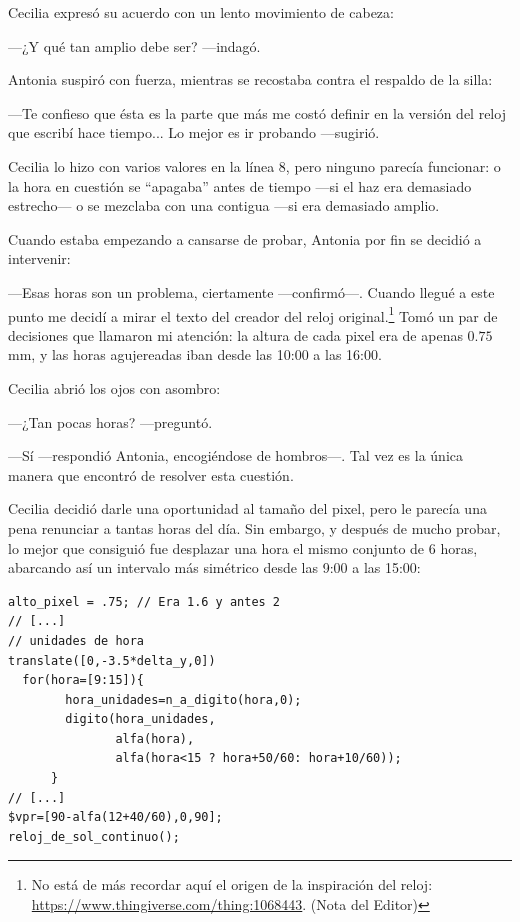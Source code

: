 Cecilia expresó su acuerdo con un lento movimiento de cabeza:

---¿Y qué tan amplio debe ser? ---indagó.

Antonia suspiró con fuerza, mientras se recostaba contra el respaldo
de la silla:

---Te confieso que ésta es la parte que más me costó definir en la
versión del reloj que escribí hace tiempo... Lo mejor es ir probando
---sugirió.

Cecilia lo hizo con varios valores en la línea 8, pero ninguno parecía
funcionar: o la hora en cuestión se ``apagaba'' antes de tiempo ---si
el haz era demasiado estrecho--- o se mezclaba con una contigua ---si
era demasiado amplio.

Cuando estaba empezando a cansarse de probar, Antonia por fin se
decidió a intervenir:

---Esas horas son un problema, ciertamente ---con\-fir\-\mbox{mó---.} Cuando
llegué a este punto me decidí a mirar el texto del creador del reloj
original.\footnote{No está de más recordar aquí el origen de la
  inspiración del reloj:
  \url{https://www.thingiverse.com/thing:1068443}. (Nota del Editor)}
Tomó un par de decisiones que llamaron mi atención: la altura de cada
pixel era de apenas $0.75$ mm, y las horas agujereadas iban desde las
10:00 a las 16:00.

Cecilia abrió los ojos con asombro:

---¿Tan pocas horas?  ---preguntó.

---Sí ---respondió Antonia, encogiéndose de hombros---.  Tal vez es la
única manera que encontró de resolver esta cuestión.

Cecilia decidió darle una oportunidad al tamaño del pixel, pero le
parecía una pena renunciar a tantas horas del día. Sin embargo, y
después de mucho probar, lo mejor que consiguió fue desplazar una hora
el mismo conjunto de 6 horas, abarcando así un intervalo más simétrico
desde las 9:00 a las 15:00:

\begin{lstlisting}
alto_pixel = .75; // Era 1.6 y antes 2
// [...]
// unidades de hora
translate([0,-3.5*delta_y,0])
  for(hora=[9:15]){
        hora_unidades=n_a_digito(hora,0);
        digito(hora_unidades,
               alfa(hora),
               alfa(hora<15 ? hora+50/60: hora+10/60));
      }
// [...]
$vpr=[90-alfa(12+40/60),0,90];
reloj_de_sol_continuo();
\end{lstlisting}%



